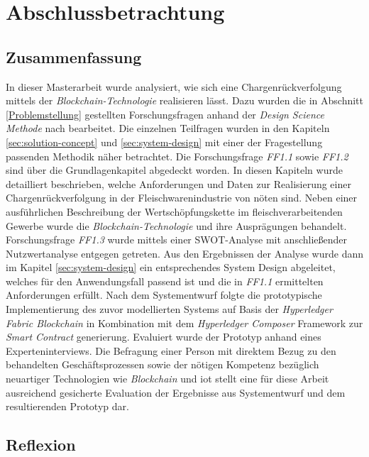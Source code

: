 \section{Abschlussbetrachtung} \label{sec:concluding-review}

\subsection{Zusammenfassung}

In dieser Masterarbeit wurde analysiert, wie sich eine Chargenrückverfolgung mittels der \textit{Blockchain-Technologie} realisieren lässt. Dazu wurden die in Abschnitt \ref{Problemstellung} gestellten Forschungsfragen anhand der \textit{Design Science Methode} nach \citet{Hevner2007} bearbeitet. Die einzelnen Teilfragen wurden in den Kapiteln \ref{sec:solution-concept} und \ref{sec:system-design} mit einer der Fragestellung passenden Methodik näher betrachtet. Die Forschungsfrage \textit{FF1.1} sowie \textit{FF1.2} sind über die Grundlagenkapitel abgedeckt worden. In diesen Kapiteln wurde detailliert beschrieben, welche Anforderungen und Daten zur Realisierung einer Chargenrückverfolgung in der Fleischwarenindustrie von nöten sind. Neben einer ausführlichen Beschreibung der Wertschöpfungskette im fleischverarbeitenden Gewerbe wurde die \textit{Blockchain-Technologie} und ihre Ausprägungen behandelt. Forschungsfrage \textit{FF1.3} wurde mittels einer SWOT-Analyse mit anschließender Nutzwertanalyse entgegen getreten. Aus den Ergebnissen der Analyse wurde dann im Kapitel \ref{sec:system-design} ein entsprechendes System Design abgeleitet, welches für den Anwendungsfall passend ist und die in \textit{FF1.1} ermittelten Anforderungen erfüllt. Nach dem Systementwurf folgte die prototypische Implementierung des zuvor modellierten Systems auf Basis der \textit{Hyperledger Fabric Blockchain} in Kombination mit dem \textit{Hyperledger Composer} Framework zur \textit{Smart Contract} generierung. Evaluiert wurde der Prototyp anhand eines Experteninterviews. Die Befragung einer Person mit direktem Bezug zu den behandelten Geschäftsprozessen sowie der nötigen Kompetenz bezüglich neuartiger Technologien wie \textit{Blockchain} und \ac{iot} stellt eine für diese Arbeit ausreichend gesicherte Evaluation der Ergebnisse aus Systementwurf und dem resultierenden Prototyp dar.

\subsection{Reflexion}

